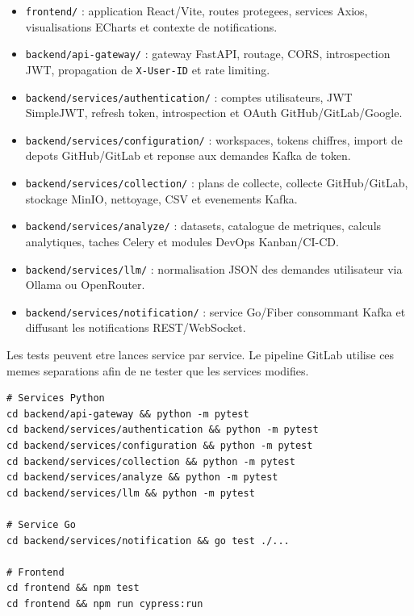 \begin{itemize}
    \item \texttt{frontend/} : application React/Vite, routes protegees, services Axios,
          visualisations ECharts et contexte de notifications.
    \item \texttt{backend/api-gateway/} : gateway FastAPI, routage, CORS, introspection JWT,
          propagation de \texttt{X-User-ID} et rate limiting.
    \item \texttt{backend/services/authentication/} : comptes utilisateurs, JWT SimpleJWT,
          refresh token, introspection et OAuth GitHub/GitLab/Google.
    \item \texttt{backend/services/configuration/} : workspaces, tokens chiffres, import de depots
          GitHub/GitLab et reponse aux demandes Kafka de token.
    \item \texttt{backend/services/collection/} : plans de collecte, collecte GitHub/GitLab,
          stockage MinIO, nettoyage, CSV et evenements Kafka.
    \item \texttt{backend/services/analyze/} : datasets, catalogue de metriques, calculs
          analytiques, taches Celery et modules DevOps Kanban/CI-CD.
    \item \texttt{backend/services/llm/} : normalisation JSON des demandes utilisateur via
          Ollama ou OpenRouter.
    \item \texttt{backend/services/notification/} : service Go/Fiber consommant Kafka et diffusant
          les notifications REST/WebSocket.
\end{itemize}

Les tests peuvent etre lances service par service. Le pipeline GitLab utilise ces memes
separations afin de ne tester que les services modifies.

\begin{lstlisting}[caption={Commandes de test par famille de services},label={lst:annexe-tests},breaklines=true]
# Services Python
cd backend/api-gateway && python -m pytest
cd backend/services/authentication && python -m pytest
cd backend/services/configuration && python -m pytest
cd backend/services/collection && python -m pytest
cd backend/services/analyze && python -m pytest
cd backend/services/llm && python -m pytest

# Service Go
cd backend/services/notification && go test ./...

# Frontend
cd frontend && npm test
cd frontend && npm run cypress:run
\end{lstlisting}

